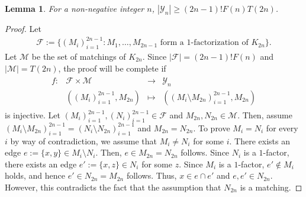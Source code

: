 \documentclass[reqno, 11pt]{amsart}
\numberwithin{equation}{section}
\newtheorem{lem}{Lemma}[section]
\theoremstyle{definition}
\newcommand{\cY}{\mathcal{Y}}
\newcommand{\cF}{\mathcal{F}}
\begin{document}
\begin{lem}	\label{lem:XZY}
	For a non-negative integer $n$, $|\cY_n| \geq (2n-1)! F(n)T(2n)$.
\end{lem}
\begin{proof}
	Let
	\begin{align*}
		\cF := \{ (M_i)_{i=1}^{2n-1} : M_1,\ldots, M_{2n-1} \text{ form a  $1$-factorization of } K_{2n} \}.
	\end{align*}
	Let $\mathcal{M}$ be the set of matchings of $K_{2n}$.
	Since $|\cF| = (2n-1)!F(n)$ and $|\mathcal{M}| = T(2n)$,
	the proof will be complete if 
	\begin{align*}
		\begin{array}{rccc}
			f : & \cF \times \mathcal{M}                    & \to     & \cY_n                                                         \\
			    & \left( (M_i)_{i=1}^{2n-1}, M_{2n} \right) & \mapsto & \left( (M_i \setminus M_{2n} )_{i=1}^{2n-1}, M_{2n} \right)
		\end{array}
	\end{align*}
	is injective.
	Let $(M_i)_{i=1}^{2n-1}, (N_i)_{i=1}^{2n-1} \in \cF$ and $M_{2n}, N_{2n} \in \mathcal{M}$.
	Then, assume $(M_i \setminus M_{2n})_{i=1}^{2n-1} = (N_i \setminus N_{2n})_{i=1}^{2n-1}$ and $M_{2n} = N_{2n}$.
	To prove $M_i = N_i$ for every $i$ by way of contradiction, we assume that $M_i \neq N_i$ for some $i$.
	There exists an edge $e := \{ x, y \} \in M_i \setminus N_i$.
	Then, $e \in M_{2n} = N_{2n}$ follows.
	Since $N_i$ is a $1$-factor, there exists an edge $e' := \{ x, z \} \in N_i$  for some $z$.
	Since $M_i$ is a $1$-factor, $e' \not\in M_i$ holds, and hence $e' \in N_{2n} = M_{2n}$ follows.
	Thus, $x \in e \cap e'$ and $e , e' \in N_{2n}$.
	However, this contradicts the fact that the assumption that $N_{2n}$ is a matching.
\end{proof}
\end{document}
